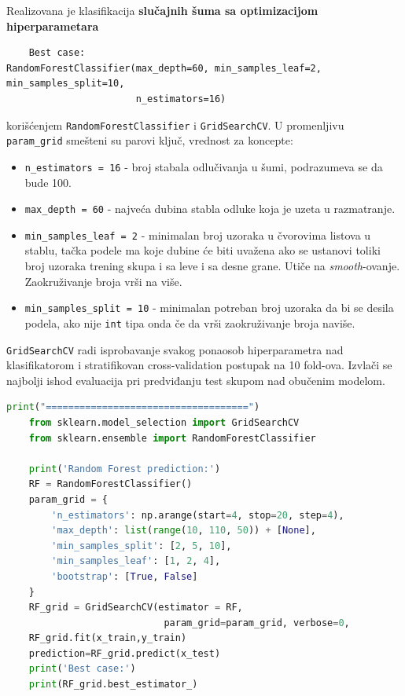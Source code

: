 \documentclass[fontsize=12bp, paper=a4]{scrarticle}
\begin{document}
 

\newpage
Realizovana je klasifikacija \textbf{slučajnih šuma sa optimizacijom hiperparametara} 

\begin{verbatim}
    Best case:
RandomForestClassifier(max_depth=60, min_samples_leaf=2, min_samples_split=10,
                       n_estimators=16)
\end{verbatim}

korišćenjem \verb|RandomForestClassifier|\cite{RFC} i \verb|GridSearchCV|. U promenljivu \verb|param_grid| smešteni su parovi ključ, vrednost za koncepte:
\begin{itemize}
    \itemsep0em
    \item \verb|n_estimators = 16| - broj stabala odlučivanja u šumi, podrazumeva se da bude 100.
    \item \verb|max_depth = 60| - najveća dubina stabla odluke koja je uzeta u razmatranje.
    \item \verb|min_samples_leaf = 2| -  minimalan broj uzoraka u čvorovima listova u stablu, tačka podele ma koje dubine će biti uvažena ako se ustanovi toliki broj uzoraka trening skupa i sa leve i sa desne grane. Utiče na \textit{smooth}-ovanje. Zaokruživanje broja vrši na više.
    \item \verb|min_samples_split = 10| - minimalan potreban broj uzoraka da bi se desila podela, ako nije \verb*|int| tipa onda če da vrši zaokruživanje broja naviše.
\end{itemize} 
\verb*|GridSearchCV| radi isprobavanje svakog ponaosob hiperparametra nad klasifikatorom i stratifikovan cross-validation postupak na 10 fold-ova. Izvlači se najbolji ishod evaluacija pri predviđanju test skupom nad obučenim modelom. 

\begin{lstlisting}[language=Python, caption={\centering Slučajne šume}]
print("====================================")
    from sklearn.model_selection import GridSearchCV
    from sklearn.ensemble import RandomForestClassifier

    print('Random Forest prediction:')
    RF = RandomForestClassifier()
    param_grid = {
        'n_estimators': np.arange(start=4, stop=20, step=4),
        'max_depth': list(range(10, 110, 50)) + [None],
        'min_samples_split': [2, 5, 10],
        'min_samples_leaf': [1, 2, 4],
        'bootstrap': [True, False]
    }
    RF_grid = GridSearchCV(estimator = RF,
                            param_grid=param_grid, verbose=0, 											cv=10, n_jobs=-1)
    RF_grid.fit(x_train,y_train)
    prediction=RF_grid.predict(x_test)
    print('Best case:')
    print(RF_grid.best_estimator_)
\end{lstlisting}
\end{document}

